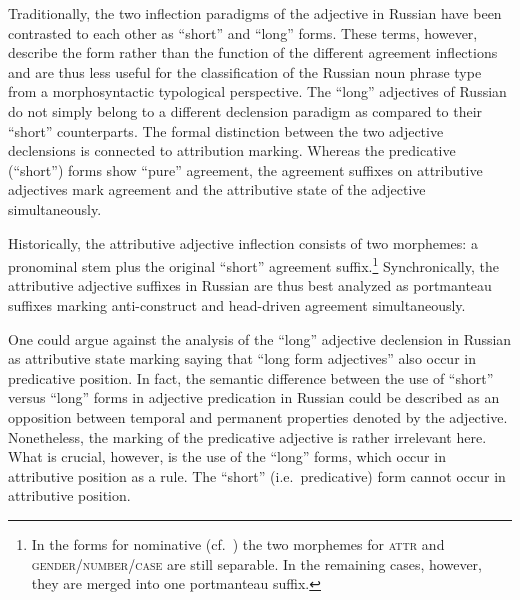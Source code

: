 Traditionally, the two inflection paradigms of the adjective in Russian have been contrasted to each other as “short” and “long” forms. These terms, however, describe the form rather than the function of the different agreement inflections and are thus less useful for the classification of the Russian noun phrase type from a morphosyntactic typological perspective. The “long” adjectives of Russian do not simply belong to a different declension paradigm as compared to their “short” counterparts. The formal distinction between the two adjective declensions is connected to attribution marking. Whereas the predicative (“short”) forms show “pure” agreement, the agreement suffixes on attributive adjectives mark agreement and the attributive state of the adjective simultaneously.

Historically, the attributive adjective inflection consists of two morphemes: a pronominal stem plus the original “short” agreement suffix.\footnote{In the forms for nominative (cf.~) the two morphemes for \textsc{attr} and \textsc{gender/number/case} are still separable. In the remaining cases, however, they are merged into one portmanteau suffix.} Synchronically, the attributive adjective suffixes in Russian are thus best analyzed as portmanteau suffixes marking anti-construct and head-driven agreement simultaneously.

One could argue against the analysis of the “long” adjective declension in Russian as attributive state marking saying that “long form adjectives” also occur in predicative position. In fact, the semantic difference between the use of “short” versus “long” forms in adjective predication in Russian could be described as an opposition between temporal and permanent properties denoted by the adjective.
Nonetheless, the marking of the predicative adjective is rather irrelevant here. What is crucial, however, is the use of the “long” forms, which occur in attributive position as a rule. The “short” (i.e.~predicative) form cannot occur in attributive position.

